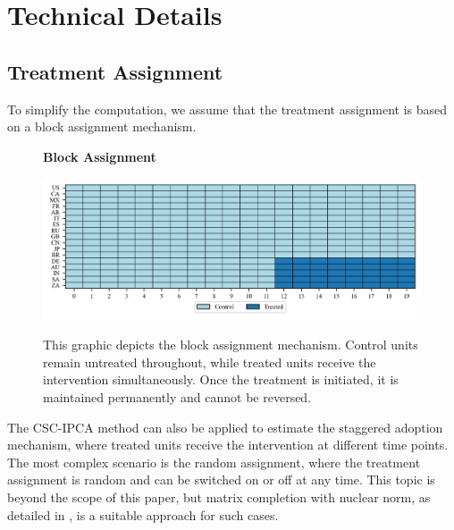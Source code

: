 \documentclass[12pt]{article}
\begin{document}
\section{Technical Details} 
\label{sec: tech details}

\subsection{Treatment Assignment}
\label{app: treatment assignment}

To simplify the computation, we assume that the treatment assignment is based on a block assignment mechanism. 

\begin{figure}[!ht]
\centering
\caption{\textbf{Block Assignment}}
\includegraphics{figs/block_assignment.png}
\label{app: block assignment}
\caption*{\footnotesize{This graphic depicts the block assignment mechanism. Control units remain untreated throughout, while treated units receive the intervention simultaneously. Once the treatment is initiated, it is maintained permanently and cannot be reversed.}}
\end{figure}

The CSC-IPCA method can also be applied to estimate the staggered adoption mechanism, where treated units receive the intervention at different time points. The most complex scenario is the random assignment, where the treatment assignment is random and can be switched on or off at any time. This topic is beyond the scope of this paper, but matrix completion with nuclear norm, as detailed in \cite{athey2021matrix}, is a suitable approach for such cases.
\end{document}

